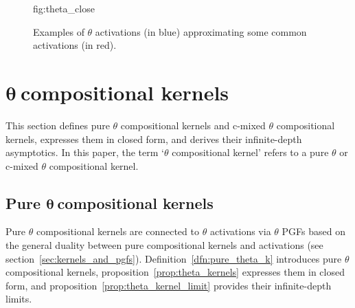 \documentclass[final, 12pt]{colt2021} %
\begin{document}
\begin{figure}[htbp]
\floatconts
{fig:theta_close}%
{\caption{Examples of $\theta$ activations (in blue)
approximating some common activations (in red).}}%
{%
}
\end{figure}

\section{\texorpdfstring{$\boldsymbol{\theta}~$} ccompositional kernels}
\label{theta_kernels}

This section defines
pure $\theta$ compositional kernels
and c-mixed $\theta$ compositional kernels,
expresses them in closed form,
and derives their infinite-depth asymptotics.
In this paper,
the term `$\theta$ compositional kernel' refers to
a pure $\theta$ or c-mixed $\theta$ compositional kernel.

\subsection{Pure \texorpdfstring{$\boldsymbol{\theta}~$} ccompositional kernels}
\label{pure_theta_kernels}

Pure $\theta$ compositional kernels are connected to $\theta$ activations
via $\theta$ PGFs
based on the general duality between pure compositional kernels and activations
(see section~\ref{sec:kernels_and_pgfs}).
Definition~\ref{dfn:pure_theta_k}
introduces pure $\theta$ compositional kernels,
proposition~\ref{prop:theta_kernels}
expresses them in closed form,
and proposition~\ref{prop:theta_kernel_limit}
provides their infinite-depth limits.

\end{document}
